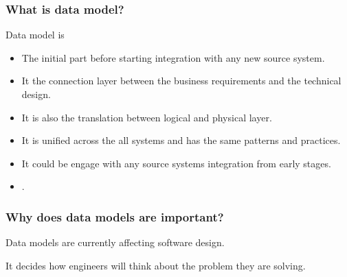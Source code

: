 
\begin{frame}
    \frametitle{What is data model?}
    Data model is
    \begin{itemize}[<+->]
        \item The initial part before starting integration with any new source system.
        \item It the connection layer between the business requirements and the technical design.
        \item It is also the translation between logical and physical layer.
        \item It is unified across the all systems and has the same patterns and practices.
        \item It could be engage with any source systems integration from early stages.
        \item {}.
    \end{itemize}
\end{frame}


\begin{frame}
    \frametitle{Why does data models are important?}
    \begin{wideitemize}
        \item Data models are currently affecting software design.
        \item It decides how engineers will think about the problem they are solving.
    \end{wideitemize}
\end{frame}

